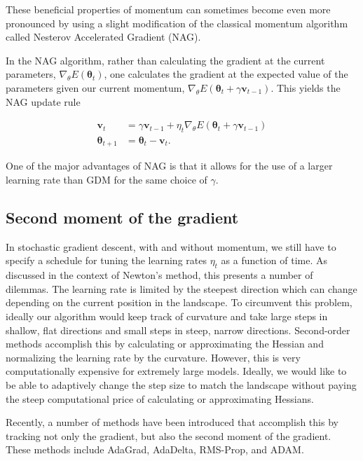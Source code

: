 \documentclass[%
oneside,                 %
final,                   %
10pt]{article}
\begin{document}
These beneficial properties of momentum can sometimes become even more
pronounced by using a slight modification of the classical momentum
algorithm called Nesterov Accelerated Gradient (NAG).

In the NAG algorithm, rather than calculating the gradient at the
current parameters, $\nabla_\theta E(\boldsymbol{\theta}_t)$, one
calculates the gradient at the expected value of the parameters given
our current momentum, $\nabla_\theta E(\boldsymbol{\theta}_t +\gamma
\mathbf{v}_{t-1})$. This yields the NAG update rule

\begin{align}
\mathbf{v}_{t}&=\gamma \mathbf{v}_{t-1}+\eta_{t}\nabla_\theta E(\boldsymbol{\theta}_t +\gamma \mathbf{v}_{t-1}) \nonumber \\
\boldsymbol{\theta}_{t+1}&= \boldsymbol{\theta}_t -\mathbf{v}_{t}.
\end{align}

One of the major advantages of NAG is that it allows for the use of a larger learning rate than GDM for the same choice of $\gamma$.


\subsection{Second moment of the gradient}


In stochastic gradient descent, with and without momentum, we still
have to specify a schedule for tuning the learning rates $\eta_t$
as a function of time.  As discussed in the context of Newton's
method, this presents a number of dilemmas. The learning rate is
limited by the steepest direction which can change depending on the
current position in the landscape. To circumvent this problem, ideally
our algorithm would keep track of curvature and take large steps in
shallow, flat directions and small steps in steep, narrow directions.
Second-order methods accomplish this by calculating or approximating
the Hessian and normalizing the learning rate by the
curvature. However, this is very computationally expensive for
extremely large models. Ideally, we would like to be able to
adaptively change the step size to match the landscape without paying
the steep computational price of calculating or approximating
Hessians.

Recently, a number of methods have been introduced that accomplish
this by tracking not only the gradient, but also the second moment of
the gradient. These methods include AdaGrad, AdaDelta, RMS-Prop, and
ADAM.
\end{document}
